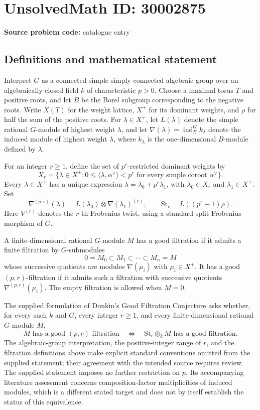 \documentclass[11pt]{article}
\begin{document}
\section*{UnsolvedMath ID: 30002875}
\textbf{Source problem code:} catalogue entry
\subsection{Definitions and mathematical statement}
Interpret \(G\) as a connected simple simply connected algebraic group over an algebraically closed field \(k\) of characteristic \(p>0\). Choose a maximal torus \(T\) and positive roots, and let \(B\) be the Borel subgroup corresponding to the negative roots. Write \(X(T)\) for the weight lattice, \(X^+\) for its dominant weights, and \(\rho\) for half the sum of the positive roots. For \(\lambda\in X^+\), let \(L(\lambda)\) denote the simple rational \(G\)-module of highest weight \(\lambda\), and let \(\nabla(\lambda)=\operatorname{ind}_B^G k_\lambda\) denote the induced module of highest weight \(\lambda\), where \(k_\lambda\) is the one-dimensional \(B\)-module defined by \(\lambda\).

For an integer \(r\geq 1\), define the set of \(p^r\)-restricted dominant weights by
\[
X_r=\{\lambda\in X^+:0\leq\langle\lambda,\alpha^\vee\rangle<p^r\text{ for every simple coroot }\alpha^\vee\}.
\]
Every \(\lambda\in X^+\) has a unique expression \(\lambda=\lambda_0+p^r\lambda_1\), with \(\lambda_0\in X_r\) and \(\lambda_1\in X^+\). Set
\[
\nabla^{(p,r)}(\lambda)=L(\lambda_0)\otimes\nabla(\lambda_1)^{(r)},
\qquad
\mathrm{St}_r=L((p^r-1)\rho).
\]
Here \(V^{(r)}\) denotes the \(r\)-th Frobenius twist, using a standard split Frobenius morphism of \(G\).

A finite-dimensional rational \(G\)-module \(M\) has a good filtration if it admits a finite filtration by \(G\)-submodules
\[
0=M_0\subset M_1\subset\cdots\subset M_n=M
\]
whose successive quotients are modules \(\nabla(\mu_i)\) with \(\mu_i\in X^+\). It has a good \((p,r)\)-filtration if it admits such a filtration with successive quotients \(\nabla^{(p,r)}(\mu_i)\). The empty filtration is allowed when \(M=0\).

The supplied formulation of Donkin's Good Filtration Conjecture asks whether, for every such \(k\) and \(G\), every integer \(r\geq1\), and every finite-dimensional rational \(G\)-module \(M\),
\[
M\text{ has a good }(p,r)\text{-filtration}
\quad\Longleftrightarrow\quad
\mathrm{St}_r\otimes_k M\text{ has a good filtration}.
\]
The algebraic-group interpretation, the positive-integer range of \(r\), and the filtration definitions above make explicit standard conventions omitted from the supplied statement; their agreement with the intended source requires review. The supplied statement imposes no further restriction on \(p\). Its accompanying literature assessment concerns composition-factor multiplicities of induced modules, which is a different stated target and does not by itself establish the status of this equivalence.
\end{document}
